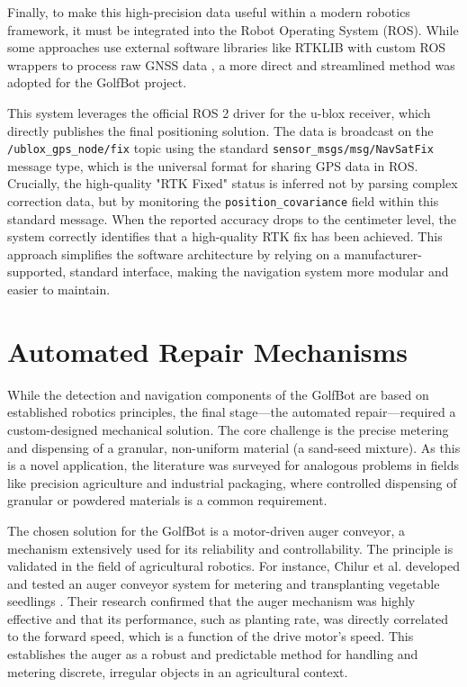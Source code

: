Finally, to make this high-precision data useful within a modern robotics framework, it must be integrated into the Robot Operating System (ROS). While some approaches use external software libraries like RTKLIB with custom ROS wrappers to process raw GNSS data \cite{ferreira2020realtime}, a more direct and streamlined method was adopted for the GolfBot project.

This system leverages the official ROS 2 driver for the u-blox receiver, which directly publishes the final positioning solution. The data is broadcast on the \texttt{/ublox\_gps\_node/fix} topic using the standard \texttt{sensor\_msgs/msg/NavSatFix} message type, which is the universal format for sharing GPS data in ROS. Crucially, the high-quality "RTK Fixed" status is inferred not by parsing complex correction data, but by monitoring the \texttt{position\_covariance} field within this standard message. When the reported accuracy drops to the centimeter level, the system correctly identifies that a high-quality RTK fix has been achieved. This approach simplifies the software architecture by relying on a manufacturer-supported, standard interface, making the navigation system more modular and easier to maintain.


\section{Automated Repair Mechanisms}
\label{sec:lit_repair_mechanisms}

While the detection and navigation components of the GolfBot are based on established robotics principles, the final stage—the automated repair—required a custom-designed mechanical solution. The core challenge is the precise metering and dispensing of a granular, non-uniform material (a sand-seed mixture). As this is a novel application, the literature was surveyed for analogous problems in fields like precision agriculture and industrial packaging, where controlled dispensing of granular or powdered materials is a common requirement.

The chosen solution for the GolfBot is a motor-driven auger conveyor, a mechanism extensively used for its reliability and controllability. The principle is validated in the field of agricultural robotics. For instance, Chilur et al. developed and tested an auger conveyor system for metering and transplanting vegetable seedlings \cite{chilur2018auger}. Their research confirmed that the auger mechanism was highly effective and that its performance, such as planting rate, was directly correlated to the forward speed, which is a function of the drive motor's speed. This establishes the auger as a robust and predictable method for handling and metering discrete, irregular objects in an agricultural context.

